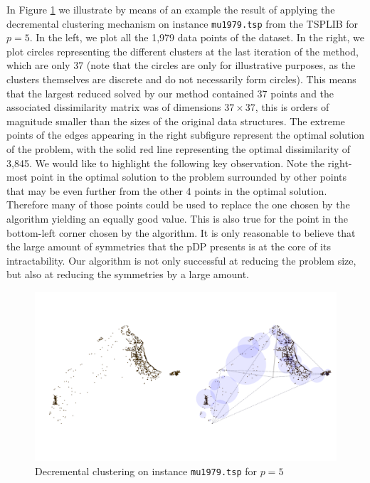 \documentclass[ijoo,nonblindrev]{informs-ijoo}
\begin{document}
In Figure \ref{fig:mu1979} we illustrate by means of an example the result of applying the decremental clustering mechanism on instance \texttt{mu1979.tsp} from the TSPLIB for $p = 5$. In the left, we plot all the 1,979 data points of the dataset. In the right, we plot circles representing the different clusters at the last iteration of the method, which are only 37 (note that the circles are only for illustrative purposes, as the clusters themselves are discrete and do not necessarily form circles). This means that the largest reduced \pDP{} solved by our method contained 37 points and the associated dissimilarity matrix was of dimensions $37\times 37$, this is orders of magnitude smaller than the sizes of the original data structures. The extreme points of the edges appearing in the right subfigure represent the optimal solution of the problem, with the solid red line representing the optimal dissimilarity of 3,845. We would like to highlight the following key observation. Note the right-most point in the optimal solution to the problem surrounded by other points that may be even further from the other 4 points in the optimal solution. Therefore many of those points could be used to replace the one chosen by the algorithm yielding an equally good value. This is also true for the point in the bottom-left corner chosen by the algorithm. It is only reasonable to believe that the large amount of symmetries that the pDP presents is at the core of its intractability. Our algorithm is not only successful at reducing the problem size, but also at reducing the symmetries by a large amount.

\begin{figure}[!hbtp]
	\centering
	\includegraphics[width=16cm]{mu1979.pdf}
	\caption{Decremental clustering on instance \texttt{mu1979.tsp}\label{fig:mu1979} for $p = 5$}
\end{figure}
\end{document}
